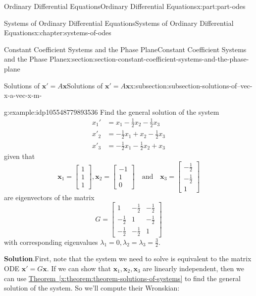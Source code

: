 \documentclass[oneside,10pt,]{book}
\newcommand{\blocktitlefont}{\relax}
\newcommand{\xreffont}{\relax}
\numberwithin{equation}{part}
\renewcommand{\vec}[1]{\mathbf{#1}}
\newcommand{\amp}{&}
\begin{document}
\begin{partptx}{Ordinary Differential Equations}{}{Ordinary Differential Equations}{}{}{x:part:part-odes}
\begin{chapterptx}{Systems of Ordinary Differential Equations}{}{Systems of Ordinary Differential Equations}{}{}{x:chapter:systems-of-odes}
\begin{sectionptx}{Constant Coefficient Systems and the Phase Plane}{}{Constant Coefficient Systems and the Phase Plane}{}{}{x:section:section-constant-coefficient-systems-and-the-phase-plane}
\begin{subsectionptx}{Solutions of \(\vec{x}' = A\vec{x}\)}{}{Solutions of \(\vec{x}' = A\vec{x}\)}{}{}{x:subsection:subsection-solutions-of--vec-x-a-vec-x-m-}
\begin{example}{}{g:example:idp105548779893536}
Find the general solution of the system%
\begin{align*}
x_{1}'  \amp = x_{1}-\frac{1}{2}x_{2}-\frac{1}{2}x_{3}\\
x'_{2}  \amp =  -\frac{1}{2}x_{1}+x_{2}-\frac{1}{2}x_{3}\\
x'_{3}  \amp =  -\frac{1}{2}x_{1}-\frac{1}{2}x_{2}+x_{3}
\end{align*}
given that%
\begin{equation*}
\vec{x}_{1} = \begin{bmatrix}1\\1\\1\end{bmatrix},\vec{x}_{2} = \begin{bmatrix}-1\\1\\0\end{bmatrix}\quad\text{and}\quad\vec{x}_{3} = \begin{bmatrix}-\frac{1}{2}\\-\frac{1}{2}\\1\end{bmatrix}
\end{equation*}
are eigenvectors of the matrix%
\begin{equation*}
G = \begin{bmatrix}1 \amp  -\frac{1}{2}  \amp  -\frac{1}{2}\\-\frac{1}{2}  \amp  1 \amp  -\frac{1}{2} \\ -\frac{1}{2}  \amp  -\frac{1}{2}  \amp    1\end{bmatrix}
\end{equation*}
with corresponding eigenvalues \(\lambda_{1} = 0,\lambda_{2} = \lambda_{3} = \frac{3}{2}\).%
\par\smallskip%
\noindent\textbf{\blocktitlefont Solution}.\hypertarget{g:solution:idp105548779896224}{}\quad{}First, note that the system we need to solve is equivalent to the matrix ODE \(\vec{x}' = G\vec{x}\). If we can show that \(\vec{x}_{1},\vec{x}_{2},\vec{x}_{3}\) are linearly independent, then we can use \hyperref[x:theorem:theorem-solutions-of-systems]{Theorem~{\xreffont\ref{x:theorem:theorem-solutions-of-systems}}} to find the general solution of the system. So we'll compute their Wronskian:%
\begin{align*}

\end{align*}
\end{example}
\end{subsectionptx}
\end{sectionptx}
\end{chapterptx}
\end{partptx}
\end{document}
